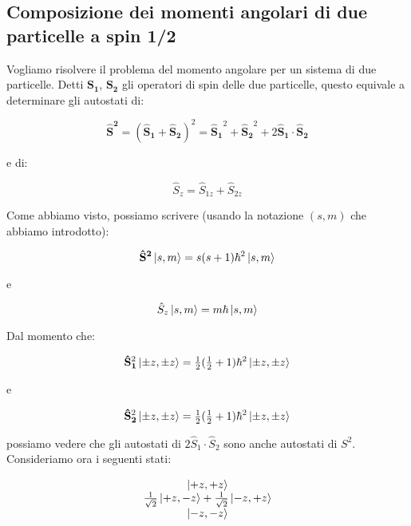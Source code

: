 \subsection{Composizione dei momenti angolari di due particelle a spin 1/2}

Vogliamo risolvere il problema del momento angolare per un sistema di due particelle. Detti $\mathbf{S_1}$, $\mathbf{S_2}$ gli operatori di spin delle due particelle, questo equivale a determinare gli autostati di:

	\begin{equation}
		\mathbf{\hat{S}^2} = ( \mathbf{\hat{S}_1} + \mathbf{\hat{S}_2} ) ^ 2 = \mathbf{\hat{S}_1}^2 + \mathbf{\hat{S}_2}^2 + 2 \mathbf{\hat{S}_1} \cdot \mathbf{\hat{S}_2}
	\end{equation}

e di:

	\begin{equation}
		\hat{S}_z = \hat{S}_{1z} + \hat{S}_{2z}
	\end{equation}

Come abbiamo visto, possiamo scrivere (usando la notazione $(s, m)$ che abbiamo introdotto):

	\begin{equation}
		\mathbf{\hat{S}^2} \ket{s, m} = s(s+1) \hbar^2 \ket{s, m}
	\end{equation}

e

	\begin{equation}
		\hat{S}_z \ket{s, m} = m \hbar \ket{s, m}
	\end{equation}

Dal momento che:

	\begin{equation}
		\mathbf{\hat{S}_1}^2 \ket{\pm z, \pm z} = \tfrac{1}{2} ( \tfrac{1}{2} + 1 ) \hbar^2 \ket{\pm z, \pm z}
	\end{equation}

e

	\begin{equation}
		\mathbf{\hat{S}_2}^2 \ket{\pm z, \pm z} = \tfrac{1}{2} ( \tfrac{1}{2} + 1 ) \hbar^2 \ket{\pm z, \pm z}
	\end{equation}

possiamo vedere che gli autostati di $2 \hat{S}_1 \cdot \hat{S}_2$ sono anche autostati di $S^2$. Consideriamo ora i seguenti stati:

	\begin{equation}
		\begin{array}{c}
			\ket{+z, +z} \\
			\frac{1}{\sqrt{2}} \ket{+z, -z} + \frac{1}{\sqrt{2}} \ket{-z, +z} \\
			\ket{-z, -z} \\
		\end{array}
	\end{equation}

